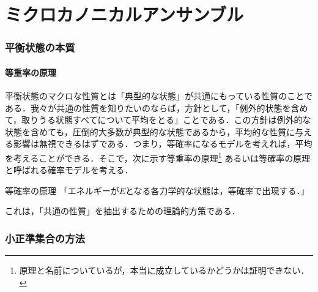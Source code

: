 \part{ミクロカノニカルアンサンブル}
\section{平衡状態の本質}
\subsection{等重率の原理}
平衡状態のマクロな性質とは「典型的な状態」が共通にもっている性質のことである．我々が共通の性質を知りたいのならば，方針として，「例外的状態を含めて，取りうる状態すべてについて平均をとる」ことである．この方針は例外的な状態を含めても，圧倒的大多数が典型的な状態であるから，平均的な性質に与える影響は無視できるはずである．つまり，等確率になるモデルを考えれば，平均を考えることができる．そこで，次に示す等重率の原理\footnote{%
原理と名前についているが，本当に成立しているかどうかは証明できない．
}
あるいは等確率の原理と呼ばれる確率モデルを考える．
　\begin{itembox}[l]{等確率の原理}
「エネルギーが$E$となる各力学的な状態は，等確率で出現する．」
\end{itembox}
これは，「共通の性質」を抽出するための理論的方策である．
\section{小正準集合の方法}
